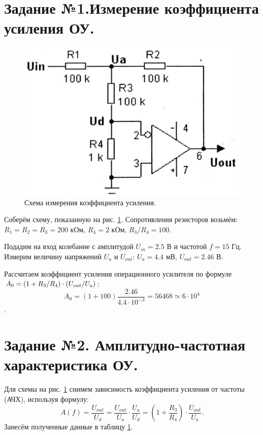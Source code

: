\documentclass[a4paper, 12pt, twoside]{article}
\newcommand*{\hm}[1]{#1\nobreak\discretionary{}
	{\hbox{$\mathsurround=0pt #1$}}{}}
\begin{document}
\section*{Задание №1.Измерение коэффициента усиления ОУ.}

\begin{figure}[H]
	\centering
	\includegraphics[width =  0.3\linewidth]{kus}
	\caption{Схема измерения коэффициента усиления.}
	\label{kus}

\end{figure}


Соберём схему, показанную на рис. \ref{kus}. Сопротивления резисторов возьмём: $R_1=R_2=R_3=200$ кОм, $R_4 = 2$ кОм, $R_3/R_4 = 100$.
\vspace{\baselineskip}

Подадим на вход колебание с амплитудой $U_{in} = 2.5$ В и частотой $f = 15$ Гц. Измерим величину напряжений $U_a$ и $U_{out}$: $U_a = 4.4 $ мВ, $U_{out} = 2.46$ В. 

\vspace{\baselineskip}

Рассчитаем коэффициент усиления операционного усилителя по формуле $A_0 = (1 \hm{+}R_3/R_4)\cdot (U_{out}/U_a)$:
$$A_0 = (1 + 100)\dfrac{2.46}{4.4\cdot 10^{-3}} = 56468  \simeq 6 \cdot 10^4$$.
\newpage
\section*{Задание №2. Амплитудно-частотная характеристика ОУ.}

Для схемы на рис. \ref{kus} снимем зависимость коэффициента усиления от частоты (АЧХ), используя формулу: $$A(f) = \dfrac{U_{out}}{U_d} = \dfrac{U_{out}}{U_a}\cdot \dfrac{U_a}{U_d} = \left(1+\dfrac{R_3}{R_4}\right )\cdot \dfrac{U_{out}}{U_a}.$$
Занесём полученные данные в таблицу \ref{kus}.
\end{document}
